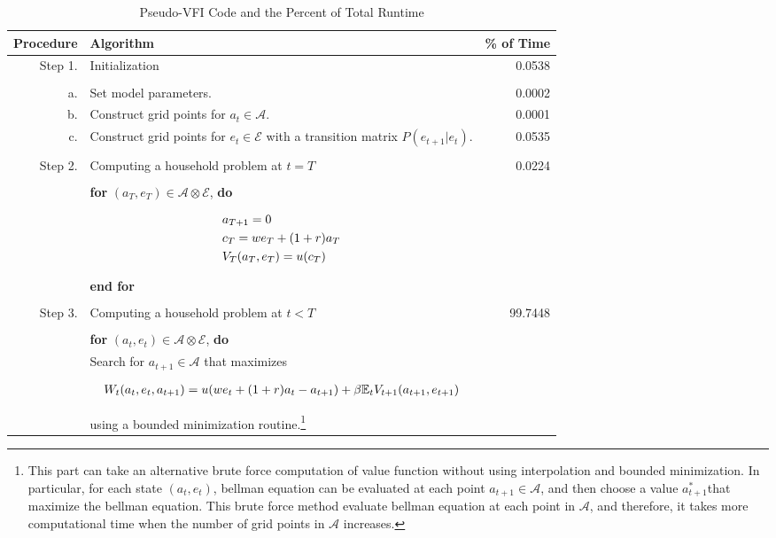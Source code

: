 \documentclass[12pt]{article}
\begin{document}
\begin{table}[h!]
\caption{Pseudo-VFI Code and the Percent of Total Runtime}
\smallskip
\small
\begin{tabular}{r p{12cm} r}\label{tab:vfi_alg}
\textbf{Procedure}& \textbf{Algorithm} & \textbf{\% of Time}\\
\hline
Step 1. &Initialization & 0.0538\\
\hline
\\[-0.7em]
		a.&  Set model parameters. & 0.0002\\
		b.&  Construct grid points for $a_{t} \in \mathcal{A}$. & 0.0001\\
		c.&  Construct grid points for $e_t \in \mathcal{E}$ with a transition matrix $P(e_{t+1}|e_t)$.&0.0535\\
\\[-0.8em]\hline
Step 2. &Computing a household problem at $t=T$ & 0.0224\\
\hline
\\[-0.8em]
		&  \textbf{for} $(a_T, e_T)\in \mathcal{A} \otimes \mathcal{E}$, \textbf{do}\\
[-1.2em]
&\parbox{4cm}{
\begin{align}
&a_{T+1}=0 \notag\\
&c_T = w e_T + (1+r) a_T \notag\\
&V_{T}(a_T,e_T) = u(c_T)\notag
\end{align}}\\
[-0.6em]
&  \textbf{end for}\\
\\[-1.0em]\hline
Step 3. & Computing a household problem at $t<T$  & 99.7448\\
\hline
\\[-0.7em]
		& \textbf{for} $(a_{t},e_{t})\in \mathcal{A} \otimes \mathcal{E}$, \textbf{do}\\
		& \hspace{2em}Search for $a_{t+1}\in \mathcal{A}$ that maximizes\\
[-0.9em]
&\parbox{4cm}{
\begin{align}
W_t(a_{t},e_t,a_{t+1}) = u(w e_t + (1+r)a_t - a_{t+1}) + \beta \mathbb{E}_t V_{t+1}(a_{t+1},e_{t+1}) \notag
\end{align}} \\
[-0.5em]
& \hspace{2em}using a bounded minimization routine.\footnote{This part can take an alternative brute force computation of value function without using interpolation and bounded minimization. In particular, for each state $(a_t,e_t)$, bellman equation can be evaluated at each point $a_{t+1}\in\mathcal{A}$, and then choose a value $a^*_{t+1}$that maximize the bellman equation. This brute force method evaluate bellman equation at each point in $\mathcal{A}$, and therefore, it takes more computational time when the number of grid points in $\mathcal{A}$ increases.} \\

\end{tabular}
\end{table}
\end{document}
